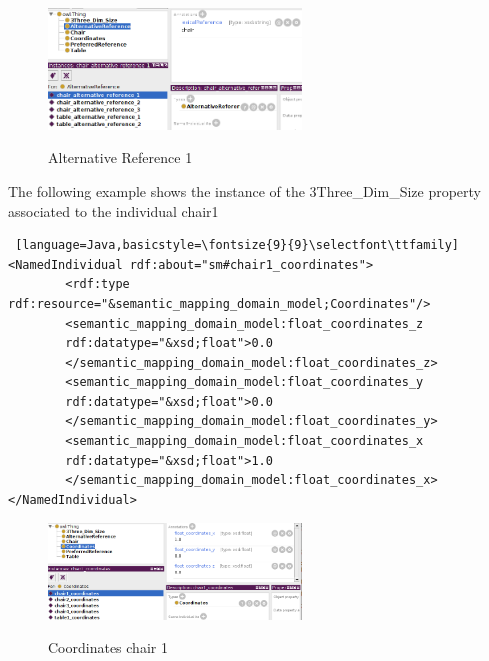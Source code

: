 \begin{figure}[H]
\centering
\includegraphics[width=0.6\textwidth]{imgs/refChair1.png}
\label{fig:datatypes}
\caption{Alternative Reference 1}
\end{figure}

The following example shows the instance of the 3Three\_Dim\_Size property associated to the individual chair1
\begin{lstlisting} [language=Java,basicstyle=\fontsize{9}{9}\selectfont\ttfamily]   
<NamedIndividual rdf:about="sm#chair1_coordinates">
        <rdf:type rdf:resource="&semantic_mapping_domain_model;Coordinates"/>
        <semantic_mapping_domain_model:float_coordinates_z 
        rdf:datatype="&xsd;float">0.0
        </semantic_mapping_domain_model:float_coordinates_z>
        <semantic_mapping_domain_model:float_coordinates_y 
        rdf:datatype="&xsd;float">0.0
        </semantic_mapping_domain_model:float_coordinates_y>
        <semantic_mapping_domain_model:float_coordinates_x 
        rdf:datatype="&xsd;float">1.0
        </semantic_mapping_domain_model:float_coordinates_x>
</NamedIndividual>
\end{lstlisting}



\begin{figure}[H]
\centering
\includegraphics[width=0.6\textwidth]{imgs/coordchair1.png}
\label{fig:datatypes}
\caption{Coordinates chair 1}
\end{figure}

